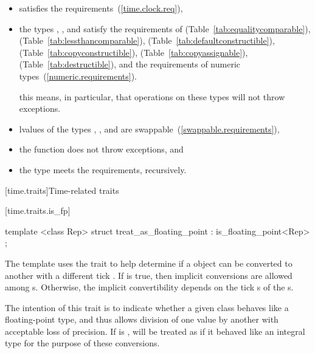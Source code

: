 \begin{itemize}
\item {} satisfies the  requirements~(\ref{time.clock.req}),

\item the types , , and 
satisfy the requirements of  (Table~\ref{tab:equalitycomparable}),
 (Table~\ref{tab:lessthancomparable}),
 (Table~\ref{tab:defaultconstructible}),
 (Table~\ref{tab:copyconstructible}),
 (Table~\ref{tab:copyassignable}),
 (Table~\ref{tab:destructible}), and the requirements of
numeric types~(\ref{numeric.requirements}). \begin{note} this means, in particular,
that operations on these types will not throw exceptions. \end{note}

\item lvalues of the types , , and
 are swappable~(\ref{swappable.requirements}),

\item the function  does not throw exceptions, and

\item the type  meets the 
requirements, recursively.
\end{itemize}

[time.traits]{Time-related traits}

[time.traits.is_fp]{}

%
\begin{itemdecl}
template <class Rep> struct treat_as_floating_point
  : is_floating_point<Rep> { };
\end{itemdecl}

\pnum
The  template uses the  trait to
help determine if a  object can be converted to another
 with a different tick . If
 is true, then implicit conversions
are allowed among s. Otherwise, the implicit convertibility
depends on the tick s of the s.
\begin{note}
The intention of this trait is to indicate whether a given class behaves like a floating-point
type, and thus allows division of one value by another with acceptable loss of precision. If
 is ,  will be treated as
if it behaved like an integral type for the purpose of these conversions.
\end{note}

